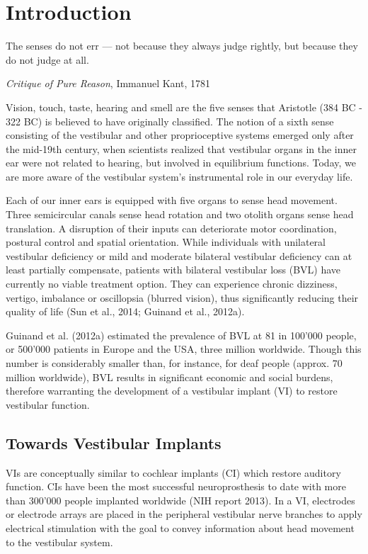 \chapter{Introduction}\label{chap:introduction}

\epigraph{The senses do not err — not because they always judge rightly, but because they do not judge at all.}{\textit{Critique of Pure Reason}, Immanuel Kant, 1781}

\noindent Vision, touch, taste, hearing and smell are  the five senses that Aristotle (384 BC - 322 BC) is believed to have originally classified. The notion of a sixth sense consisting of the vestibular and other proprioceptive systems emerged only after the mid-19th century, when scientists realized that vestibular organs in the inner ear were not related to hearing, but involved in equilibrium functions. Today, we are  more aware of the vestibular system's instrumental role in our everyday life.

Each of our inner ears is equipped with five organs to sense head movement. Three semicircular canals sense head rotation and two otolith organs sense head translation.  A disruption of their inputs can deteriorate motor coordination, postural control and spatial orientation. While individuals with unilateral vestibular deficiency or mild and moderate bilateral vestibular deficiency can at least partially compensate, patients with bilateral vestibular loss (BVL) have currently no viable treatment option. They can experience chronic dizziness, vertigo, imbalance or oscillopsia (blurred vision), thus significantly reducing their quality of life (Sun et al., 2014; Guinand et al., 2012a). 

Guinand et al. (2012a) estimated the prevalence of BVL at 81 in 100'000 people, or 500'000 patients in Europe and the USA, three million worldwide. Though this number is considerably smaller than, for instance, for deaf people (approx. 70 million worldwide), BVL results in significant economic and social burdens, therefore warranting the development of a vestibular implant (VI) to restore vestibular function.

\section*{Towards Vestibular Implants}
VIs are conceptually similar to cochlear implants (CI) which restore auditory function. CIs have been the most successful neuroprosthesis to date with more than 300'000 people implanted worldwide (NIH report 2013). In a VI, electrodes or electrode arrays are placed in the peripheral vestibular nerve branches to apply electrical stimulation with the goal to convey information about head movement to the vestibular system.

